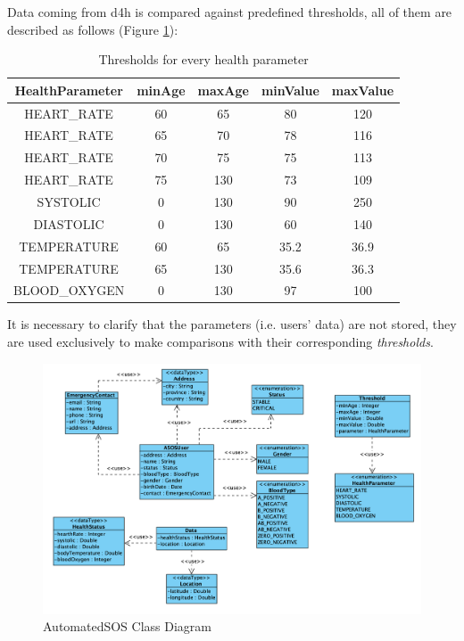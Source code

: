 \documentclass[a4paper, hidelinks, 12pt]{report}
\begin{document}
	Data coming from d4h is compared against predefined thresholds, all of them are described as follows (Figure \ref{fig:health_parameters_thresholds}): \\
	
	\begin{table}[h]
		\centering
		\begin{tabular}{c | c | c | c | c}
			\hline \hline
			\textbf{HealthParameter} & \textbf{minAge}  & \textbf{maxAge} & \textbf{minValue} & \textbf{maxValue}  \\ [0.5ex]
			\hline
				HEART\_RATE  & 60 & 65 & 80 & 120  \\
				HEART\_RATE  & 65 & 70  & 78 & 116 \\
				HEART\_RATE  & 70 & 75 & 75  & 113  \\
				HEART\_RATE  & 75 & 130 & 73 & 109 \\
				SYSTOLIC   & 0 & 130 & 90 & 250  \\
				DIASTOLIC & 0 & 130 & 60 & 140   \\
				TEMPERATURE  & 60 & 65 & 35.2 & 36.9 \\
				TEMPERATURE & 65 & 130 & 35.6 & 36.3 \\
				BLOOD\_OXYGEN   & 0 & 130 & 97 & 100    
		\end{tabular}
		\caption{Thresholds for every health parameter}
		\label{fig:health_parameters_thresholds}
	\end{table}
	
		It is necessary to clarify that the parameters (i.e. users' data) are not stored, they are used exclusively to make comparisons with their corresponding  \textit{thresholds}. \\
	
	
	\begin{figure}[H]
    		\centering
		\includegraphics[width=1.1\textwidth]{diagrams/asos_class_diagram.png}
		\caption[AutomatedSOS Class Diagram]{AutomatedSOS Class Diagram}
		\label{fig:AutomatedSOS Class Diagram}
	\end{figure}
	
\end{document}
